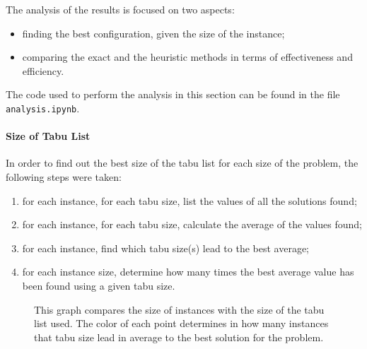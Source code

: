 \documentclass{article}
\begin{document}
The analysis of the results is focused on two aspects:
\begin{itemize}
    \item finding the best configuration, given the size of the instance;
    \item comparing the exact and the heuristic methods in terms of effectiveness and efficiency.
\end{itemize}

The code used to perform the analysis in this section can be found in the file \texttt{analysis.ipynb}.

\paragraph{Size of Tabu List}
In order to find out the best size of the tabu list for each size of the problem, the following steps were taken:
\begin{enumerate}
    \item for each instance, for each tabu size, list the values of all the solutions found;
    \item for each instance, for each tabu size, calculate the average of the values found;
    \item for each instance, find which tabu size(s) lead to the best average;
    \item for each instance size, determine how many times the best average value has been found using a given tabu size.
\end{enumerate}

\begin{figure}
    \centering
    \caption{
        This graph compares the size of instances with the size of the tabu list used.
        The color of each point determines in how many instances that tabu size lead in average to the best solution for the problem.
    }
    \label{fig:tabu}
\end{figure}
\end{document}
